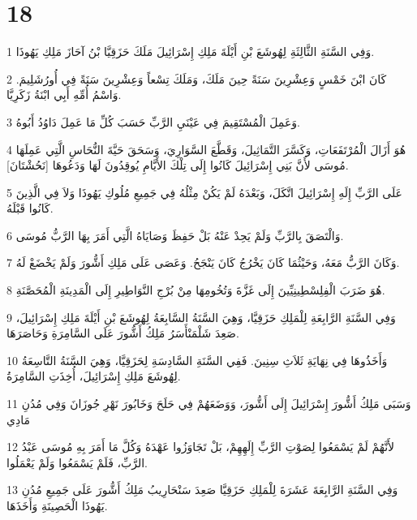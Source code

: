 \chapter{18}

\par 1 وَفِي السَّنَةِ الثَّالِثَةِ لِهُوشَعَ بْنِ أَيْلَةَ مَلِكِ إِسْرَائِيلَ مَلَكَ حَزَقِيَّا بْنُ آحَازَ مَلِكِ يَهُوذَا.
\par 2 كَانَ ابْنَ خَمْسٍ وَعِشْرِينَ سَنَةً حِينَ مَلَكَ، وَمَلَكَ تِسْعاً وَعِشْرِينَ سَنَةً فِي أُورُشَلِيمَ. وَاسْمُ أُمِّهِ أَبِي ابْنَةُ زَكَرِيَّا.
\par 3 وَعَمِلَ الْمُسْتَقِيمَ فِي عَيْنَيِ الرَّبِّ حَسَبَ كُلِّ مَا عَمِلَ دَاوُدُ أَبُوهُ.
\par 4 هُوَ أَزَالَ الْمُرْتَفَعَاتِ، وَكَسَّرَ التَّمَاثِيلَ، وَقَطَّعَ السَّوَارِيَ، وَسَحَقَ حَيَّةَ النُّحَاسِ الَّتِي عَمِلَهَا مُوسَى لأَنَّ بَنِي إِسْرَائِيلَ كَانُوا إِلَى تِلْكَ الأَيَّامِ يُوقِدُونَ لَهَا وَدَعُوهَا [نَحُشْتَانَ].
\par 5 عَلَى الرَّبِّ إِلَهِ إِسْرَائِيلَ اتَّكَلَ، وَبَعْدَهُ لَمْ يَكُنْ مِثْلُهُ فِي جَمِيعِ مُلُوكِ يَهُوذَا وَلاَ فِي الَّذِينَ كَانُوا قَبْلَهُ.
\par 6 وَالْتَصَقَ بِالرَّبِّ وَلَمْ يَحِدْ عَنْهُ بَلْ حَفِظَ وَصَايَاهُ الَّتِي أَمَرَ بِهَا الرَّبُّ مُوسَى.
\par 7 وَكَانَ الرَّبُّ مَعَهُ، وَحَيْثُمَا كَانَ يَخْرُجُ كَانَ يَنْجَحُ. وَعَصَى عَلَى مَلِكِ أَشُّورَ وَلَمْ يَخْضَعْ لَهُ.
\par 8 هُوَ ضَرَبَ الْفِلِسْطِينِيِّينَ إِلَى غَزَّةَ وَتُخُومِهَا مِنْ بُرْجِ النَّوَاطِيرِ إِلَى الْمَدِينَةِ الْمُحَصَّنَةِ.
\par 9 وَفِي السَّنَةِ الرَّابِعَةِ لِلْمَلِكِ حَزَقِيَّا، وَهِيَ السَّنَةُ السَّابِعَةُ لِهُوشَعَ بْنِ أَيْلَةَ مَلِكِ إِسْرَائِيلَ، صَعِدَ شَلْمَنْأَسَرُ مَلِكُ أَشُّورَ عَلَى السَّامِرَةِ وَحَاصَرَهَا.
\par 10 وَأَخَذُوهَا فِي نِهَايَةِ ثَلاَثِ سِنِينَ. فَفِي السَّنَةِ السَّادِسَةِ لِحَزَقِيَّا، وَهِيَ السَّنَةُ التَّاسِعَةُ لِهُوشَعَ مَلِكِ إِسْرَائِيلَ، أُخِذَتِ السَّامِرَةُ.
\par 11 وَسَبَى مَلِكُ أَشُّورَ إِسْرَائِيلَ إِلَى أَشُّورَ، وَوَضَعَهُمْ فِي حَلَحَ وَخَابُورَ نَهْرِ جُوزَانَ وَفِي مُدُنِ مَادِي
\par 12 لأَنَّهُمْ لَمْ يَسْمَعُوا لِصَوْتِ الرَّبِّ إِلَهِهِمْ، بَلْ تَجَاوَزُوا عَهْدَهُ وَكُلَّ مَا أَمَرَ بِهِ مُوسَى عَبْدُ الرَّبِّ، فَلَمْ يَسْمَعُوا وَلَمْ يَعْمَلُوا.
\par 13 وَفِي السَّنَةِ الرَّابِعَةَ عَشَرَةَ لِلْمَلِكِ حَزَقِيَّا صَعِدَ سَنْحَارِيبُ مَلِكُ أَشُّورَ عَلَى جَمِيعِ مُدُنِ يَهُوذَا الْحَصِينَةِ وَأَخَذَهَا.
